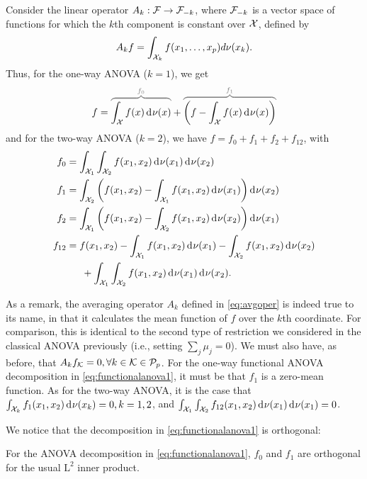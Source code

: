 Consider the linear operator $A_k:{\mathcal F}\to {\mathcal F}_{-k}$, where ${\mathcal F}_{-k}$ is a vector space of functions for which the $k$th component is constant over ${\mathcal X}$, defined by
\begin{align}\label{eq:avgoper}
  A_k f = \int_{{\mathcal X}_k} f(x_1,\dots,x_p) d\nu(x_k).
\end{align}
Thus, for the one-way ANOVA ($k=1$), we get
\begin{align}\label{eq:functionalanova1}
  f = 
  \greyoverbrace{\int_\cX f(x)\d\nu(x)}{f_0} 
  + 
  \greyoverbrace{\left( f - \int_\cX f(x)\d\nu(x) \right)}{f_1}
\end{align}
and for the two-way ANOVA ($k=2$), we have $f = f_0 + f_1 + f_2 + f_{12}$, with
\begin{align*}
  f_0 &= \int_{\cX_1}\int_{\cX_2} f(x_1,x_2) \d\nu(x_1)\d\nu(x_2) \\
  f_1 &= \int_{\cX_2} \left( f(x_1,x_2) - \int_{\cX_1} f(x_1,x_2) \d\nu(x_1) \right) \d\nu(x_2)\\  
  f_2 &= \int_{\cX_1} \left( f(x_1,x_2) - \int_{\cX_2} f(x_1,x_2) \d\nu(x_2) \right) \d\nu(x_1)\\  
  f_{12} &= f(x_1,x_2) - \int_{\cX_1} f(x_1,x_2) \d\nu(x_1) - \int_{\cX_2} f(x_1,x_2) \d\nu(x_2) \\
  &\phantom{==} + \int_{\cX_1}\int_{\cX_2} f(x_1,x_2) \d\nu(x_1)\d\nu(x_2).
\end{align*}

As a remark, the averaging operator $A_k$ defined in \eqref{eq:avgoper} is indeed true to its name, in that it calculates the mean function of $f$ over the $k$th coordinate. 
For comparison, this is identical to the second type of restriction we considered in the classical ANOVA previously (i.e., setting $\sum_j \mu_j = 0$).
We must also have, as before, that $A_kf_{\mathcal K} = 0, \forall k \in {\mathcal K} \in {\mathcal P}_p$.
For the one-way functional ANOVA decomposition in \eqref{eq:functionalanova1}, it must be that $f_1$ is a zero-mean function.
As for the two-way ANOVA, it is the case that $\int_{{\mathcal X}_k} f_1(x_1,x_2) \operatorname{d\!\:\!}\nu(x_k) = 0, k=1,2$, and $\int_{{\mathcal X}_1}\int_{{\mathcal X}_2} f_{12}(x_1,x_2) \operatorname{d\!\:\!}\nu(x_1)\operatorname{d\!\:\!}\nu(x_1) = 0$.

We notice that the decomposition in \eqref{eq:functionalanova1} is orthogonal:

\begin{claim}
  For the ANOVA decomposition in \eqref{eq:functionalanova1}, $f_0$ and $f_1$ are orthogonal for the usual $\text{L}^2$ inner product.
\end{claim}

